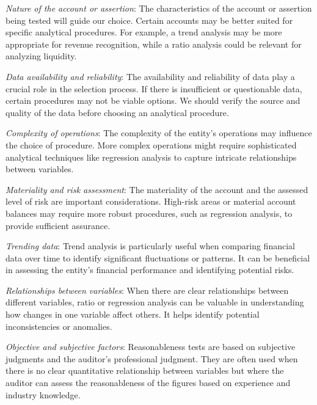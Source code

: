 \begin{compactitem}
\item \textit{Nature of the account or assertion}: The characteristics of the account or assertion being tested will guide our choice. Certain accounts may be better suited for specific analytical procedures. For example, a trend analysis may be more appropriate for revenue recognition, while a ratio analysis could be relevant for analyzing liquidity.

\item \textit{Data availability and reliability}: The availability and reliability of data play a crucial role in the selection process. If there is insufficient or questionable data, certain procedures may not be viable options. We should verify the source and quality of the data before choosing an analytical procedure.

\item \textit{Complexity of operations}: The complexity of the entity's operations may influence the choice of procedure. More complex operations might require sophisticated analytical techniques like regression analysis to capture intricate relationships between variables.

\item \textit{Materiality and risk assessment}: The materiality of the account and the assessed level of risk are important considerations. High-risk areas or material account balances may require more robust procedures, such as regression analysis, to provide sufficient assurance.

\item \textit{Trending data}: Trend analysis is particularly useful when comparing financial data over time to identify significant fluctuations or patterns. It can be beneficial in assessing the entity's financial performance and identifying potential risks.

\item \textit{Relationships between variables}: When there are clear relationships between different variables, ratio or regression analysis can be valuable in understanding how changes in one variable affect others. It helps identify potential inconsistencies or anomalies.

\item \textit{Objective and subjective factors}: Reasonableness tests are based on subjective judgments and the auditor's professional judgment. They are often used when there is no clear quantitative relationship between variables but where the auditor can assess the reasonableness of the figures based on experience and industry knowledge.


\end{compactitem}

